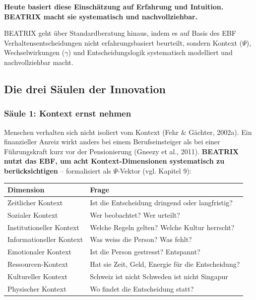 \documentclass[11pt,a4paper]{article}
\begin{document}
\textbf{Heute basiert diese Einschätzung auf Erfahrung und Intuition. BEATRIX macht sie systematisch und nachvollziehbar.}

BEATRIX geht über Standardberatung hinaus, indem es auf Basis des EBF Verhaltensentscheidungen nicht erfahrungsbasiert beurteilt, sondern Kontext ($\Psi$), Wechselwirkungen ($\gamma$) und Entscheidungslogik systematisch modelliert und nachvollziehbar macht.

\subsection{Die drei Säulen der Innovation}

\subsubsection{Säule 1: Kontext ernst nehmen}

Menschen verhalten sich nicht isoliert vom Kontext (Fehr \& Gächter, 2002a). Ein finanzieller Anreiz wirkt anders bei einem Berufseinsteiger als bei einer Führungskraft kurz vor der Pensionierung (Gneezy et al., 2011). \textbf{BEATRIX nutzt das EBF, um acht Kontext-Dimensionen systematisch zu berücksichtigen} -- formalisiert als $\Psi$-Vektor (vgl. Kapitel 9):

\begin{table}[h]
\centering
\begin{tabular}{@{}L{4cm}L{9cm}@{}}
\toprule
\textbf{Dimension} & \textbf{Frage} \\
\midrule
Zeitlicher Kontext & Ist die Entscheidung dringend oder langfristig? \\
Sozialer Kontext & Wer beobachtet? Wer urteilt? \\
Institutioneller Kontext & Welche Regeln gelten? Welche Kultur herrscht? \\
Informationeller Kontext & Was weiss die Person? Was fehlt? \\
Emotionaler Kontext & Ist die Person gestresst? Entspannt? \\
Ressourcen-Kontext & Hat sie Zeit, Geld, Energie für die Entscheidung? \\
Kultureller Kontext & Schweiz ist nicht Schweden ist nicht Singapur \\
Physischer Kontext & Wo findet die Entscheidung statt? \\
\bottomrule
\end{tabular}
\end{table}
\end{document}
